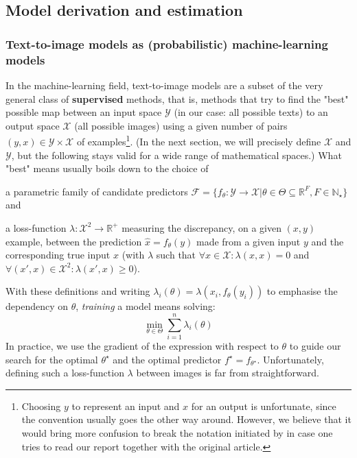 \documentclass{article}
\begin{document}
\begin{multicols}{2}
\subsection{Model derivation and estimation} \label{derivation}

\subsubsection{Text-to-image models as (probabilistic) machine-learning models} \label{section:probml}


In the machine-learning field, text-to-image models are a subset of the very general class of \textbf{supervised} methods, that is, methods that try to find the "best" possible map between an input space $\mathcal{Y}$ (in our case: all possible texts) to an output space $\mathcal{X}$ (all possible images) using a given number of pairs $(y,x)\in\mathcal{Y}\times\mathcal{X}$ of examples\footnote{Choosing $y$ to represent an input and $x$ for an output is unfortunate, since the convention usually goes the other way around.
However, we believe that it would bring more confusion to break the notation initiated by \citeauthor{zeroshot} in case one tries to read our report together with the original article.}.
(In the next section, we will precisely define $\mathcal{X}$ and $\mathcal{Y}$, but the following stays valid for a wide range of mathematical spaces.)
What "best" means usually boils down to the choice of \begin{enumerate*}[label=(\roman*)]
\item a parametric family of candidate predictors $\mathcal{F}=\{f_\theta:\mathcal{Y}\to\mathcal{X}|\theta \in \Theta \subseteq \mathbb{R}^F, F\in\mathbb{N}_\star\}$ and 
\item a loss-function $\lambda:\mathcal{X}^2\to\mathbb{R}^+$ measuring the discrepancy, on a given $(x,y)$ example, between the prediction $\hat x = f_\theta(y)$ made from a given input $y$ and the corresponding true input $x$
(with $\lambda$ such that $\forall x \in \mathcal{X}:\lambda(x,x)=0$ and $\forall (x',x)\in\mathcal{X}^2:\lambda(x',x)\geqslant 0$).
\end{enumerate*}
With these definitions and writing $\lambda_i(\theta)=\lambda(x_i,f_\theta(y_i))$ to emphasise the dependency on $\theta$, \textit{training} a model means solving:
\begin{equation} \label{eq:minloss}
    \min_{\theta\in\Theta} \sum_{i=1}^{n} \lambda_i(\theta)
\end{equation}
In practice, we use the gradient of the expression with respect to $\theta$ to guide our search for the optimal $\theta^\star$ and the optimal predictor $f^\star=f_{\theta^\star}$.
Unfortunately, defining such a loss-function $\lambda$ between images is far from straightforward.


\end{multicols}
\end{document}
